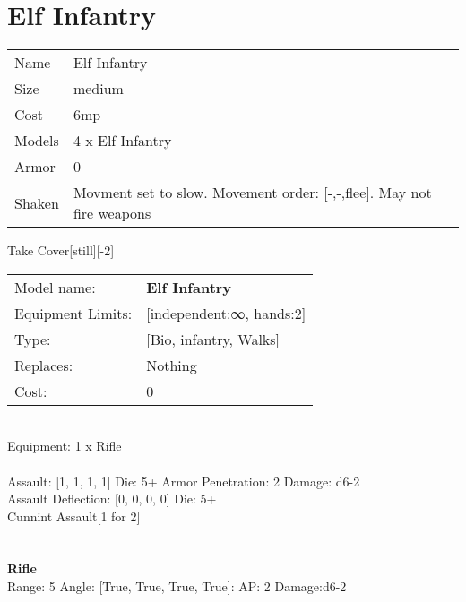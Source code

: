\pagebreak

\section{ Elf Infantry }

\begin{tabular}{ll}
  Name & Elf Infantry \\
  Size & medium\\
  Cost & 6mp\\
  Models & 4 x Elf Infantry\\
  Armor & 0\\
  Shaken & Movment set to slow. Movement order: [-,-,flee]. May not fire weapons\\
\end{tabular}

\noindent Take Cover[still][-2]\\ 


\noindent
\begin{tabular}{ll}
Model name: &{\bf Elf Infantry } \\
Equipment Limits: &[independent:∞, hands:2] \\
Type: &[Bio, infantry, Walks] \\
Replaces: &Nothing \\
Cost: & 0\\
\end{tabular}
\ \\
Equipment: 1 x Rifle \\
\ \\
Assault: [1, 1, 1, 1] Die: 5+ Armor Penetration: 2 Damage: d6-2 \\
Assault Deflection: [0, 0, 0, 0] Die: 5+\\
\indent Cunnint Assault[1 for 2]\\ 
 
\ \\

\ \\
{\bf Rifle } \\



Range: 5  Angle: [True, True, True, True]: AP: 2 Damage:d6-2 \\




 
\ \\



